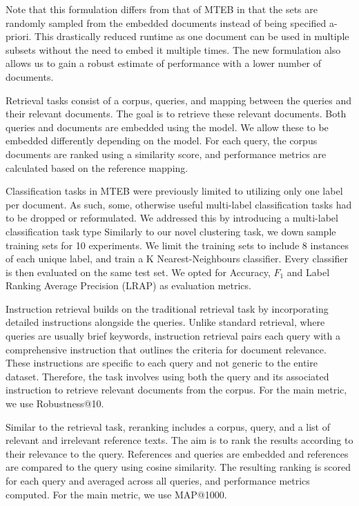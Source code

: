 Note that this formulation differs from that of MTEB in that the sets are randomly sampled from the embedded documents instead of being specified a-priori.
This drastically reduced runtime as one document can be used in multiple subsets without the need to embed it multiple times.
The new formulation also allows us to gain a robust estimate of performance with a lower number of documents.


\noindent
{} 
Retrieval tasks consist of a corpus, queries, and mapping between the queries and their relevant documents. The goal is to retrieve these relevant documents. Both queries and documents are embedded using the model. We allow these to be embedded differently depending on the model. For each query, the corpus documents are ranked using a similarity score, and performance metrics are calculated based on the reference mapping.

\noindent
{}
Classification tasks in MTEB were previously limited to utilizing only one label per document.
As such, some, otherwise useful multi-label classification tasks had to be dropped or reformulated.
We addressed this by introducing a multi-label classification task type
Similarly to our novel clustering task, we down sample training sets for 10 experiments.
We limit the training sets to include 8 instances of each unique label, and train a K Nearest-Neighbours classifier.
Every classifier is then evaluated on the same test set.
We opted for Accuracy, $F_1$ and Label Ranking Average Precision (LRAP) as evaluation metrics.

\noindent
{}
Instruction retrieval builds on the traditional retrieval task by incorporating detailed instructions alongside the queries. Unlike standard retrieval, where queries are usually brief keywords, instruction retrieval pairs each query with a comprehensive instruction that outlines the criteria for document relevance. These instructions are specific to each query and not generic to the entire dataset.
Therefore, the task involves using both the query and its associated instruction to retrieve relevant documents from the corpus. For the main metric, we use Robustness@10.

\noindent
{}
Similar to the retrieval task, reranking includes a corpus, query, and a list of relevant and irrelevant reference texts. The aim is to rank the results according to their relevance to the query. References and queries are embedded and references are compared to the query using cosine similarity. The resulting ranking is scored for each query and averaged across all queries, and performance metrics computed. For the main metric, we use MAP@1000.

